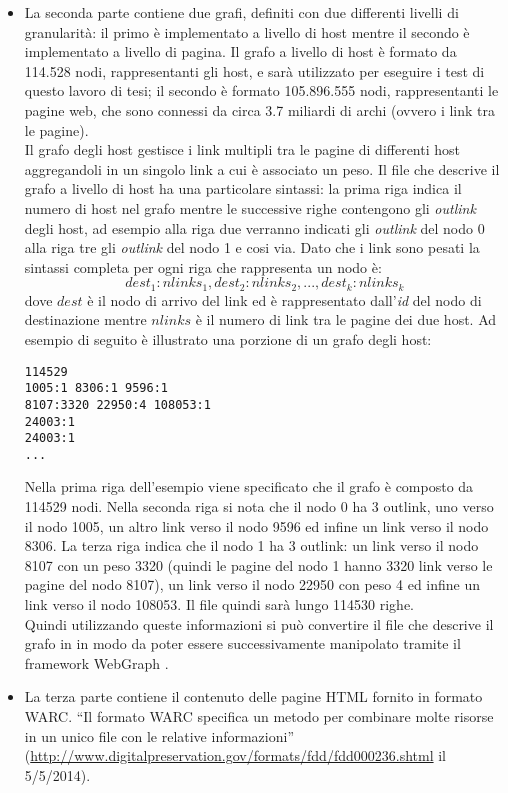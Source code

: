 \begin{itemize}
 
 \item La seconda parte contiene due grafi, definiti con due differenti livelli di granularità: il primo è implementato a livello di host mentre il secondo è implementato a livello di pagina. Il grafo a livello di host  è formato da 114.528 nodi, rappresentanti gli host, e sarà utilizzato per eseguire i test di questo lavoro di tesi; il secondo è formato  105.896.555 nodi, rappresentanti le pagine web, che sono  connessi da circa 3.7 miliardi di archi (ovvero i link tra le pagine).\\
 Il grafo degli host gestisce i link multipli tra le pagine di differenti host aggregandoli in un singolo link a cui è associato un peso. Il file che descrive il grafo a livello di host ha una particolare sintassi: la prima riga indica il numero di host nel grafo mentre le successive righe contengono gli \textit{outlink} degli host, ad esempio alla riga due verranno indicati gli \textit{outlink} del nodo 0 alla riga tre gli \textit{outlink} del nodo 1 e cosi via. Dato che i link sono pesati la sintassi completa per ogni riga che rappresenta un nodo è:
 $$
 dest_1:nlinks_1,dest_2:nlinks_2,...,dest_k:nlinks_k
 $$
 dove \(dest\) è il nodo di arrivo del link ed è rappresentato dall'\textit{id} del nodo di destinazione mentre \(nlinks\) è il numero di link tra le pagine dei due host.
 Ad esempio di seguito è illustrato una porzione di un grafo degli host:
\begin{lstlisting}[frame=trbl,postbreak=\space, breakindent=5pt, breaklines]
114529
1005:1 8306:1 9596:1 
8107:3320 22950:4 108053:1
24003:1
24003:1
...
\end{lstlisting}
Nella prima riga dell'esempio viene specificato che il grafo è composto da 114529 nodi. Nella seconda riga si nota che il nodo 0 ha 3 outlink, uno verso il nodo 1005, un altro link verso il nodo 9596 ed infine un link verso il nodo 8306. La terza riga indica che il nodo 1 ha 3 outlink: un link verso il nodo 8107 con un peso 3320 (quindi le pagine del nodo 1 hanno 3320 link verso le pagine del nodo 8107), un link verso il nodo 22950 con peso 4 ed infine un link verso il nodo 108053. Il file quindi sarà lungo 114530 righe.\\
Quindi utilizzando queste informazioni si può convertire il file che descrive il grafo in  in modo da poter essere successivamente manipolato tramite il framework WebGraph \cite{Boldi03thewebgraph}.
\item La terza parte contiene il contenuto delle pagine HTML fornito in formato WARC. ``Il formato WARC specifica un metodo per combinare molte risorse in un unico file con le relative informazioni'' (\url{http://www.digitalpreservation.gov/formats/fdd/fdd000236.shtml} il 5/5/2014).
\end{itemize}

